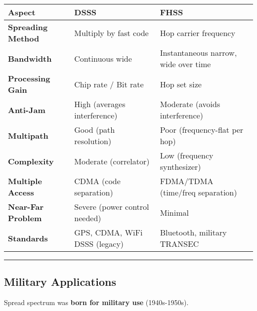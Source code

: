 {\def\LTcaptype{} %
\begin{longtable}[]{@{}
  >{\raggedright\arraybackslash}p{}
  >{\raggedright\arraybackslash}p{}
  >{\raggedright\arraybackslash}p{}@{}}
\toprule\noalign{}
\begin{minipage}[b]{\linewidth}\raggedright
Aspect
\end{minipage} & \begin{minipage}[b]{\linewidth}\raggedright
DSSS
\end{minipage} & \begin{minipage}[b]{\linewidth}\raggedright
FHSS
\end{minipage} \\
\midrule\noalign{}
\endhead
\bottomrule\noalign{}
\endlastfoot
\textbf{Spreading Method} & Multiply by fast code & Hop carrier
frequency \\
\textbf{Bandwidth} & Continuous wide & Instantaneous narrow, wide over
time \\
\textbf{Processing Gain} & Chip rate / Bit rate & Hop set size \\
\textbf{Anti-Jam} & High (averages interference) & Moderate (avoids
interference) \\
\textbf{Multipath} & Good (path resolution) & Poor (frequency-flat per
hop) \\
\textbf{Complexity} & Moderate (correlator) & Low (frequency
synthesizer) \\
\textbf{Multiple Access} & CDMA (code separation) & FDMA/TDMA (time/freq
separation) \\
\textbf{Near-Far Problem} & Severe (power control needed) & Minimal \\
\textbf{Standards} & GPS, CDMA, WiFi DSSS (legacy) & Bluetooth, military
TRANSEC \\
\end{longtable}
}

\begin{center}\rule{0.5\linewidth}{0.5pt}\end{center}

\subsection{\texorpdfstring{ Military
Applications}{ Military Applications}}\label{military-applications}

Spread spectrum was \textbf{born for military use} (1940s-1950s).

